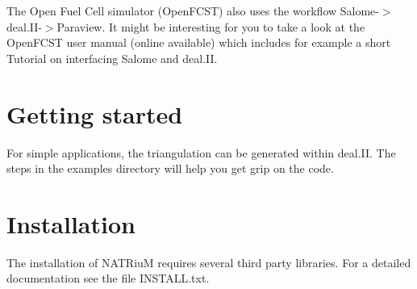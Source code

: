 The Open Fuel Cell simulator (Open\-F\-C\-S\-T) also uses the workflow Salome-\/$>$deal.\-I\-I-\/$>$Paraview. It might be interesting for you to take a look at the Open\-F\-C\-S\-T user manual (online available) which includes for example a short Tutorial on interfacing Salome and deal.\-I\-I.\hypertarget{index_start_sec}{}\section{Getting started}\label{index_start_sec}
For simple applications, the triangulation can be generated within deal.\-I\-I. The steps in the examples directory will help you get grip on the code.\hypertarget{index_install_sec}{}\section{Installation}\label{index_install_sec}
The installation of N\-A\-T\-Riu\-M requires several third party libraries. For a detailed documentation see the file I\-N\-S\-T\-A\-L\-L.\-txt. 